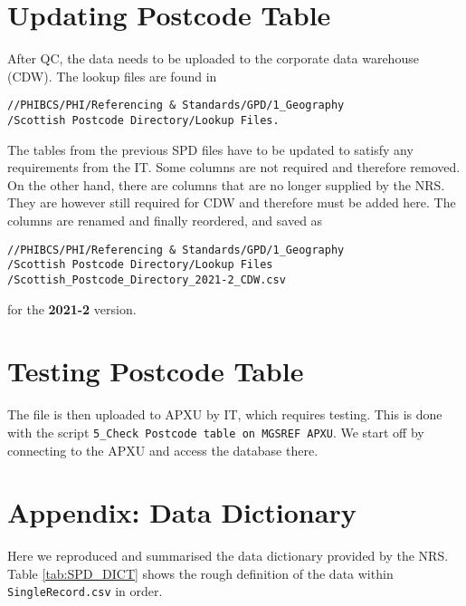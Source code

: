 \documentclass[12pt]{article}
\begin{document}
\section{Updating Postcode Table}
After QC, the data needs to be uploaded to the
corporate data warehouse (CDW). The lookup files are found in
\begin{lstlisting}
//PHIBCS/PHI/Referencing & Standards/GPD/1_Geography
/Scottish Postcode Directory/Lookup Files.
\end{lstlisting} 
The tables from
the previous SPD files have to be updated to satisfy
any requirements from the IT. Some columns
are not required and therefore removed. On the other hand,
there are columns that are no longer supplied by the NRS.
They are however still required for CDW and therefore
must be added here. The columns are renamed and finally
reordered, and saved as
\begin{lstlisting}
//PHIBCS/PHI/Referencing & Standards/GPD/1_Geography
/Scottish Postcode Directory/Lookup Files
/Scottish_Postcode_Directory_2021-2_CDW.csv
\end{lstlisting} 
for the \textbf{2021-2} version.

\section{Testing Postcode Table}
The file is then uploaded to APXU by IT,
which requires testing. This is done with the script
\texttt{5\_Check Postcode table on MGSREF APXU}.
We start off by connecting to the APXU and access
the database there. 

\appendix
\section{Appendix: Data Dictionary}\label{appendix:dict}
Here we reproduced and summarised the data dictionary provided by the NRS. Table {\ref{tab:SPD_DICT}} shows the rough definition of the data within \texttt{SingleRecord.csv}
in order.
\end{document}
